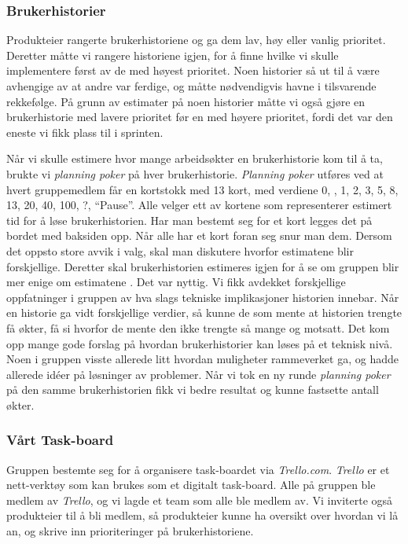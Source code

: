 \documentclass[12pt,a4paper,norsk]{article}
\begin{document}
  \subsubsection{Brukerhistorier}
  Produkteier rangerte brukerhistoriene og ga dem lav, høy eller vanlig prioritet. Deretter måtte vi rangere historiene igjen, for å finne hvilke vi skulle implementere først av de med høyest prioritet. Noen historier så ut til å være avhengige av at andre var ferdige, og måtte nødvendigvis havne i tilsvarende rekkefølge. På grunn av estimater på noen historier måtte vi også gjøre en brukerhistorie med lavere prioritet før en med høyere prioritet, fordi det var den eneste vi fikk plass til i sprinten.


    Når vi skulle estimere hvor mange arbeidsøkter en brukerhistorie kom til å ta, brukte vi \textit{planning poker} på hver brukerhistorie. \textit{Planning poker} utføres ved at hvert gruppemedlem får en kortstokk med 13 kort, med verdiene 0, , 1, 2, 3, 5, 8, 13, 20, 40, 100, ?, “Pause”. Alle velger ett av kortene som representerer estimert tid for å løse brukerhistorien. Har man bestemt seg for et kort legges det på bordet med baksiden opp. Når alle har et kort foran seg snur man dem. Dersom det oppsto store avvik i valg, skal man diskutere hvorfor estimatene blir forskjellige. Deretter skal brukerhistorien estimeres igjen for å se om gruppen blir mer enige om estimatene \cite[side 38-40]{kniberg}.
    Det var nyttig. Vi fikk avdekket forskjellige oppfatninger i gruppen av hva slags tekniske implikasjoner historien innebar. Når en historie ga vidt forskjellige verdier, så kunne de som mente at historien trengte få økter, få si hvorfor de mente den ikke trengte så mange og motsatt. Det kom opp mange gode forslag på hvordan brukerhistorier kan løses på et teknisk nivå. Noen i gruppen visste allerede litt hvordan muligheter rammeverket ga, og hadde allerede idéer på løsninger av problemer. Når vi tok en ny runde \textit{planning poker} på den samme brukerhistorien fikk vi bedre resultat og kunne fastsette antall økter.

  \subsubsection{Vårt Task-board}
  Gruppen bestemte seg for å organisere task-boardet via \textit{Trello.com}. \textit{Trello} er et nett-verktøy som kan brukes som et digitalt task-board. Alle på gruppen ble medlem av \textit{Trello}, og vi lagde et team som alle ble medlem av. Vi inviterte også produkteier til å bli medlem, så produkteier kunne ha oversikt over hvordan vi lå an, og skrive inn prioriteringer på brukerhistoriene.
\end{document}
